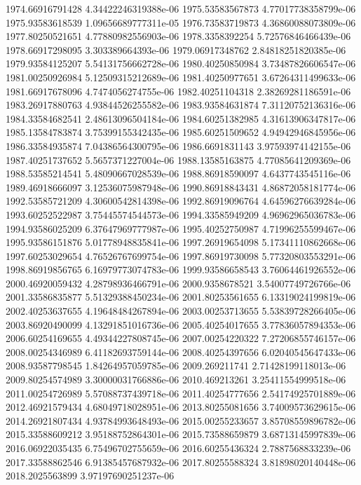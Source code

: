 {1974.66916791428 4.34422246319388e-06
1975.53583567873 4.77017738358799e-06
1975.93583618539 1.09656689777311e-05
1976.73583719873 4.36860088073809e-06
1977.80250521651 4.77880982556903e-06
1978.3358392254 5.72576846466439e-06
1978.66917298095 3.303389664393e-06
1979.06917348762 2.84818251820385e-06
1979.93584125207 5.54131756662728e-06
1980.40250850984 3.73487826606547e-06
1981.00250926984 5.12509315212689e-06
1981.40250977651 3.67264311499633e-06
1981.66917678096 4.7474056274755e-06
1982.40251104318 2.38269281186591e-06
1983.26917880763 4.93844526255582e-06
1983.93584631874 7.31120752136316e-06
1984.33584682541 2.48613096504184e-06
1984.60251382985 4.31613906347817e-06
1985.13584783874 3.75399155342435e-06
1985.60251509652 4.94942946845956e-06
1986.33584935874 7.04386564300795e-06
1986.6691831143 3.97593974142155e-06
1987.40251737652 5.5657371227004e-06
1988.13585163875 4.77085641209369e-06
1988.53585214541 5.48090667028539e-06
1988.86918590097 4.6437743545116e-06
1989.46918666097 3.12536075987948e-06
1990.86918843431 4.86872058181774e-06
1992.53585721209 4.30600542814398e-06
1992.86919096764 4.64596276639284e-06
1993.60252522987 3.75445574544573e-06
1994.33585949209 4.96962965036783e-06
1994.93586025209 6.37647969777987e-06
1995.40252750987 4.71996255599467e-06
1995.93586151876 5.01778948835841e-06
1997.26919654098 5.17341110862668e-06
1997.60253029654 4.76526767699754e-06
1997.86919730098 5.77320803553291e-06
1998.86919856765 6.16979773074783e-06
1999.93586658543 3.76064461926552e-06
2000.46920059432 4.28798936466791e-06
2000.9358678521 3.54007749726766e-06
2001.33586835877 5.51329388450234e-06
2001.80253561655 6.13319024199819e-06
2002.40253637655 4.19648484267894e-06
2003.00253713655 5.53839728266405e-06
2003.86920490099 4.13291851016736e-06
2005.40254017655 3.77836057894353e-06
2006.60254169655 4.49344227808745e-06
2007.00254220322 7.27206855746157e-06
2008.00254346989 6.41182693759144e-06
2008.40254397656 6.02040545647433e-06
2008.93587798545 1.84264957059785e-06
2009.269211741 2.71428199118013e-06
2009.80254574989 3.30000031766886e-06
2010.469213261 3.25411554999518e-06
2011.00254726989 5.57088737439718e-06
2011.40254777656 2.54174925701889e-06
2012.46921579434 4.68049718028951e-06
2013.80255081656 3.74009573629615e-06
2014.26921807434 4.93784993648493e-06
2015.00255233657 3.85708559896782e-06
2015.33588609212 3.95188752864301e-06
2015.73588659879 3.68713145997839e-06
2016.06922035435 6.75496702755659e-06
2016.60255436324 2.7887568833239e-06
2017.33588862546 6.91385457687932e-06
2017.80255588324 3.81898020140448e-06
2018.2025563899 3.97197690251237e-06
}
